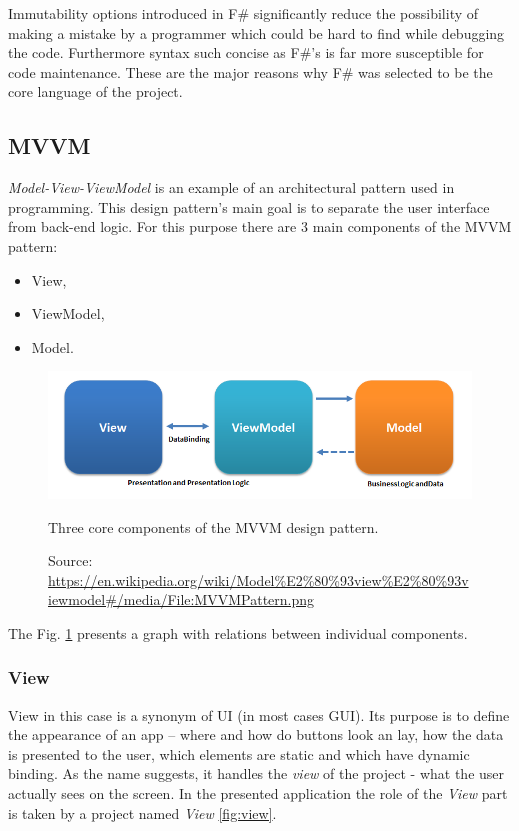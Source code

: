     Immutability options introduced in F\# significantly reduce the possibility of making a mistake by a programmer which could be hard to find while debugging the code. Furthermore syntax such concise as F\#'s is far more susceptible for code maintenance.
    These are the major reasons why F\# was selected to be the core language of the project.
\subsection{MVVM}
    \textit{Model-View-ViewModel} is an example of an architectural pattern used in programming. This design pattern's main goal is to separate the user interface from back-end logic. For this purpose there are 3 main components of the MVVM pattern:
    \begin{itemize}
        \item View,
        \item ViewModel,
        \item Model.
    \end{itemize}
    
    \begin{figure}[H]
        \centering
        \includegraphics[width=\textwidth]{img/MVVMPattern.png}
        \caption{Three core components of the MVVM design pattern.}
        \label{fig:mvvm_pattern}
        \caption*{Source: \url{https://en.wikipedia.org/wiki/Model\%E2\%80\%93view\%E2\%80\%93viewmodel\#/media/File:MVVMPattern.png}}
    \end{figure}
    The Fig. \ref{fig:mvvm_pattern} presents a graph with relations between individual components.
    
    \subsubsection{View}
        View in this case is a synonym of UI (in most cases GUI). Its purpose is to define the appearance of an app -- where and how do buttons look an lay, how the data is presented to the user, which elements are static and which have dynamic binding. As the name suggests, it handles the \textit{view} of the project - what the user actually sees on the screen.
        In the presented application the role of the \textit{View} part is taken by a project named \textit{View} \ref{fig:view}.
        
